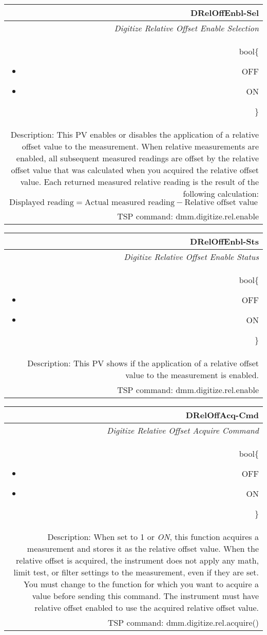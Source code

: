 \documentclass[openany]{article}
\begin{document}
		\begin{tabular}{N}
			\hline
			\bfseries DRelOffEnbl-Sel\label{pv:dreloffenbl-sel} \\ \hline
			\emph{Digitize Relative Offset Enable Selection} \\
			bool\{\begin{itemize}[noitemsep]
				\small
				\item[] OFF
				\item[] ON
			\end{itemize}\} \\
			Description: This PV enables or disables the application of a relative offset value to the measurement. When relative measurements are enabled, all subsequent measured readings are offset by the relative offset value that was calculated when you acquired the relative offset value. Each returned measured relative reading is the result of the following calculation: $$\text{Displayed reading} = \text{Actual measured reading} - \text{Relative offset value}$$ \\
			TSP command: dmm.digitize.rel.enable
		\end{tabular}

		\begin{tabular}{N}
			\hline
			\bfseries DRelOffEnbl-Sts\label{pv:dreloffenbl-sts} \\ \hline
			\emph{Digitize Relative Offset Enable Status} \\
			bool\{\begin{itemize}[noitemsep]
				\small
				\item[] OFF
				\item[] ON
			\end{itemize}\} \\
			Description: This PV shows if the application of a relative offset value to the measurement is enabled. \\
			TSP command: dmm.digitize.rel.enable
		\end{tabular}

		\begin{tabular}{N}
			\hline
			\bfseries DRelOffAcq-Cmd\label{pv:dreloffacq-cmd} \\ \hline
			\emph{Digitize Relative Offset Acquire Command} \\
			bool\{\begin{itemize}[noitemsep]
				\small
				\item[] OFF
				\item[] ON
			\end{itemize}\} \\
			Description: When set to 1 or \emph{ON}, this function acquires a measurement and stores it as the relative offset value. When the relative offset is acquired, the instrument does not apply any math, limit test, or filter settings to the measurement, even if they are set. You must change to the function for which you want to acquire a value before sending this command. The instrument must have relative offset enabled to use the acquired relative offset value. \\
			TSP command: dmm.digitize.rel.acquire()
		\end{tabular}
\end{document}
